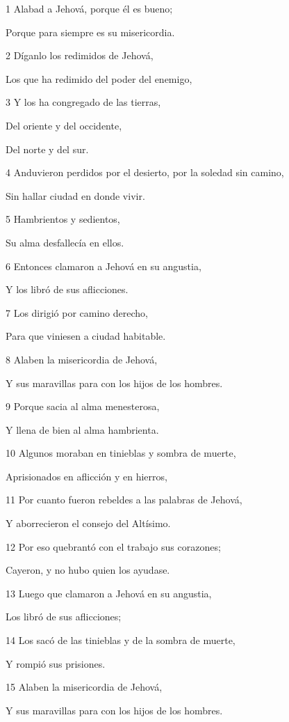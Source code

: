 \par 1 Alabad a Jehová, porque él es bueno;
\par Porque para siempre es su misericordia.
\par 2 Díganlo los redimidos de Jehová,
\par Los que ha redimido del poder del enemigo,
\par 3 Y los ha congregado de las tierras,
\par Del oriente y del occidente,
\par Del norte y del sur.
\par 4 Anduvieron perdidos por el desierto, por la soledad sin camino,
\par Sin hallar ciudad en donde vivir.
\par 5 Hambrientos y sedientos,
\par Su alma desfallecía en ellos.
\par 6 Entonces clamaron a Jehová en su angustia,
\par Y los libró de sus aflicciones.
\par 7 Los dirigió por camino derecho,
\par Para que viniesen a ciudad habitable.
\par 8 Alaben la misericordia de Jehová,
\par Y sus maravillas para con los hijos de los hombres.
\par 9 Porque sacia al alma menesterosa,
\par Y llena de bien al alma hambrienta.
\par 10 Algunos moraban en tinieblas y sombra de muerte,
\par Aprisionados en aflicción y en hierros,
\par 11 Por cuanto fueron rebeldes a las palabras de Jehová,
\par Y aborrecieron el consejo del Altísimo.
\par 12 Por eso quebrantó con el trabajo sus corazones;
\par Cayeron, y no hubo quien los ayudase.
\par 13 Luego que clamaron a Jehová en su angustia,
\par Los libró de sus aflicciones;
\par 14 Los sacó de las tinieblas y de la sombra de muerte,
\par Y rompió sus prisiones.
\par 15 Alaben la misericordia de Jehová,
\par Y sus maravillas para con los hijos de los hombres.

